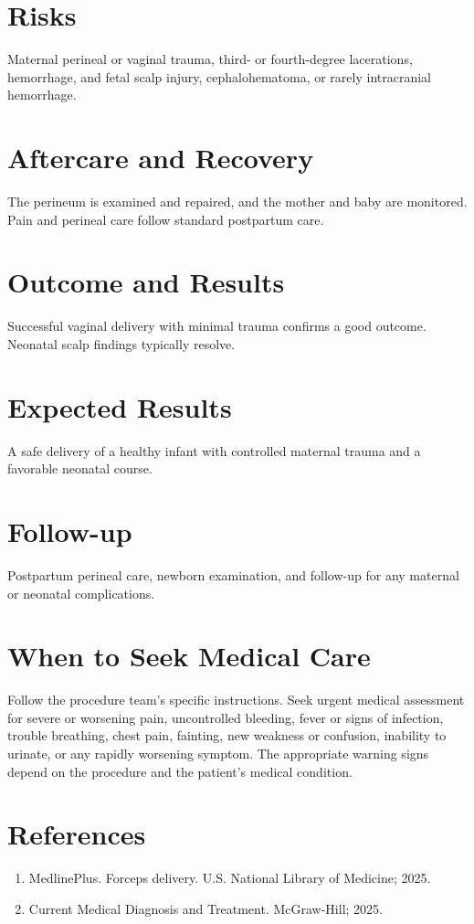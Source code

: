 \section*{Risks}
Maternal perineal or vaginal trauma, third- or fourth-degree lacerations, hemorrhage, and fetal scalp injury, cephalohematoma, or rarely intracranial hemorrhage.

\section*{Aftercare and Recovery}
The perineum is examined and repaired, and the mother and baby are monitored. Pain and perineal care follow standard postpartum care.

\section*{Outcome and Results}
Successful vaginal delivery with minimal trauma confirms a good outcome. Neonatal scalp findings typically resolve.

\section*{Expected Results}
A safe delivery of a healthy infant with controlled maternal trauma and a favorable neonatal course.

\section*{Follow-up}
Postpartum perineal care, newborn examination, and follow-up for any maternal or neonatal complications.

\section*{When to Seek Medical Care}
Follow the procedure team's specific instructions. Seek urgent medical assessment for severe or worsening pain, uncontrolled bleeding, fever or signs of infection, trouble breathing, chest pain, fainting, new weakness or confusion, inability to urinate, or any rapidly worsening symptom. The appropriate warning signs depend on the procedure and the patient's medical condition.

\section*{References}
\begin{enumerate}
  \item MedlinePlus. Forceps delivery. U.S. National Library of Medicine; 2025.
  \item Current Medical Diagnosis and Treatment. McGraw-Hill; 2025.
\end{enumerate}

\clearpage
